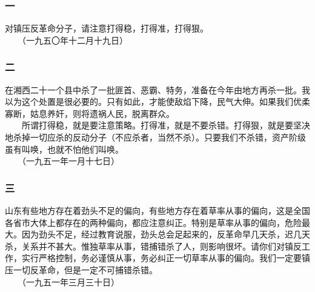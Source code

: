 \documentclass[cn,11pt,chinese]{elegantbook}
\def\myformat#1{\hfil\hfil #1}
\begin{document}
\subsubsection*{\myformat{一}}
对镇压反革命分子，请注意打得稳，打得准，打得狠。\\
　　（一九五〇年十二月十九日）\\
\subsubsection*{\myformat{二}}
在湘西二十一个县中杀了一批匪首、恶霸、特务，准备在今年由地方再杀一批。我以为这个处置是很必要的。只有如此，才能使敌焰下降，民气大伸。如果我们优柔寡断，姑息养奸，则将遗祸人民，脱离群众。\\
　　所谓打得稳，就是要注意策略。打得准，就是不要杀错。打得狠，就是要坚决地杀掉一切应杀的反动分子（不应杀者，当然不杀）。只要我们不杀错，资产阶级虽有叫唤，也就不怕他们叫唤。\\
　　（一九五一年一月十七日）\\
\subsubsection*{\myformat{三}}
山东有些地方存在着劲头不足的偏向，有些地方存在着草率从事的偏向，这是全国各省市大体上都存在的两种偏向，都应注意纠正。特别是草率从事的偏向，危险最大。因为劲头不足，经过教育说服，劲头总会足起来的，反革命早几天杀，迟几天杀，关系并不甚大。惟独草率从事，错捕错杀了人，则影响很坏。请你们对镇反工作，实行严格控制，务必谨慎从事，务必纠正一切草率从事的偏向。我们一定要镇压一切反革命，但是一定不可捕错杀错。\\
　　（一九五一年三月三十日）\\
\end{document}
